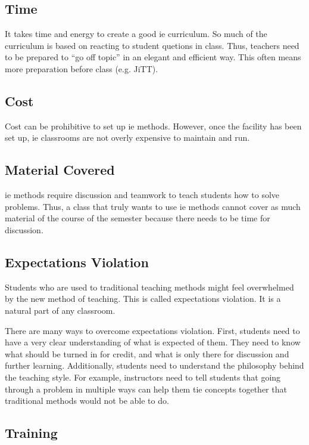\subsection{Time}

It takes time and energy to create a good \gls{ie} curriculum. So much of the curriculum is based on reacting to student quetions in class. Thus, teachers need to be prepared to ``go off topic'' in an elegant and efficient way. This often means more preparation before class (e.g. JiTT).

\subsection{Cost}

Cost can be prohibitive to set up \gls{ie} methods. However, once the facility has been set up, \gls{ie} classrooms are not overly expensive to maintain and run.

\subsection{Material Covered}

\gls{ie} methods require discussion and teamwork to teach students how to solve problems. Thus, a class that truly wants to use \gls{ie} methods cannot cover as much material of the course of the semester because there needs to be time for discussion.

\subsection{Expectations Violation}

Students who are used to traditional teaching methods might feel overwhelmed by the new method of teaching. This is called expectations violation. It is a natural part of any classroom.

There are many ways to overcome expectations violation. First, students need to have a very clear understanding of what is expected of them. They need to know what should be turned in for credit, and what is only there for discussion and further learning. Additionally, students need to understand the philosophy behind the teaching style. For example, instructors need to tell students that going through a problem in multiple ways can help them tie concepts together that traditional methods would not be able to do.

\subsection{Training}


